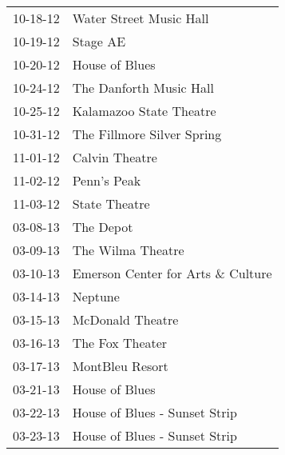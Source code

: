 \begin{supertabular}{p{0.07\textwidth}p{0.23\textwidth}}
 10-18-12 &            Water Street Music Hall \\
 10-19-12 &                           Stage AE \\
 10-20-12 &                     House of Blues \\
 10-24-12 &            The Danforth Music Hall \\
 10-25-12 &            Kalamazoo State Theatre \\
 10-31-12 &         The Fillmore Silver Spring \\
 11-01-12 &                     Calvin Theatre \\
 11-02-12 &                        Penn's Peak \\
 11-03-12 &                      State Theatre \\
 03-08-13 &                          The Depot \\
 03-09-13 &                  The Wilma Theatre \\
 03-10-13 &  Emerson Center for Arts \& Culture \\
 03-14-13 &                            Neptune \\
 03-15-13 &                   McDonald Theatre \\
 03-16-13 &                    The Fox Theater \\
 03-17-13 &                    MontBleu Resort \\
 03-21-13 &                     House of Blues \\
 03-22-13 &      House of Blues - Sunset Strip \\
 03-23-13 &      House of Blues - Sunset Strip \\
\end{supertabular}
